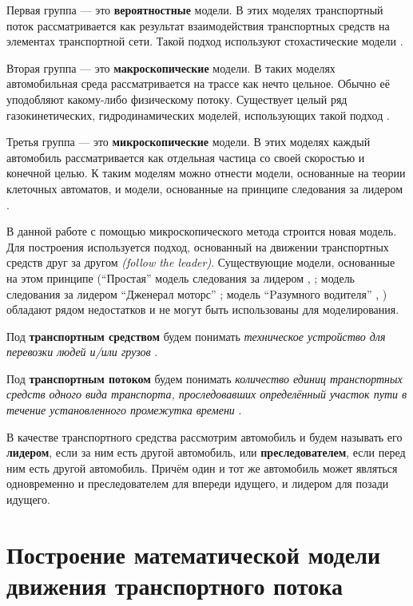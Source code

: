 \documentclass[12pt, a4paper]{extarticle}
\numberwithin{equation}{section}
\numberwithin{figure}{section}
\begin{document}
Первая группа --- это \textbf{вероятностные} модели. В этих моделях транспортный поток рассматривается как результат взаимодействия транспортных средств на элементах транспортной сети.
Такой подход используют стохастические модели \cite{probabilistic_model}.

Вторая группа --- это \textbf{макроскопические} модели. В таких моделях автомобильная среда рассматривается на трассе как нечто цельное. Обычно её уподобляют какому-либо физическому потоку. Существует целый ряд газокинетических, гидродинамических моделей, использующих такой подход \cite{macro_model}.

Третья группа --- это \textbf{микроскопические} модели. В этих моделях каждый автомобиль рассматривается как отдельная частица со своей скоростью и конечной целью. К таким моделям можно отнести модели, основанные на теории клеточных автоматов, и модели, основанные на принципе следования за лидером \cite{micro_model}.

В данной работе с помощью микроскопического метода строится новая модель. Для построения используется подход, основанный на движении транспортных средств друг за другом {\it(follow the leader)}. Существующие модели, основанные на этом принципе (``Простая'' модель следования за лидером \cite{FirstFollowTheLeaderModel}, \cite{RefineFirstFollowTheLeaderModel}; модель следования за лидером ``Дженерал моторс'' \cite{GazisModel}; модель ``Pазумного водителя'' \cite{TreiberModel_1}, \cite{TreiberModel_2}) обладают рядом недостатков и не могут быть использованы для моделирования.

Под \textbf{транспортным средством} будем понимать {\it техническое устройство для перевозки людей и/или грузов} \cite{TrafficFlow}.

Под \textbf{транспортным потоком} будем понимать {\it количество единиц транспортных средств одного вида транспорта, проследовавших определённый участок пути в течение установленного промежутка времени} \cite{TrafficFlow}.

В качестве транспортного средства рассмотрим автомобиль и будем называть его \textbf{лидером}, если за ним есть другой автомобиль, или \textbf{преследователем}, если перед ним есть другой автомобиль. Причём один и тот же автомобиль может являться одновременно и преследователем для впереди идущего, и лидером для позади идущего. 

\section{Построение математической модели движения транспортного потока}
\end{document}
